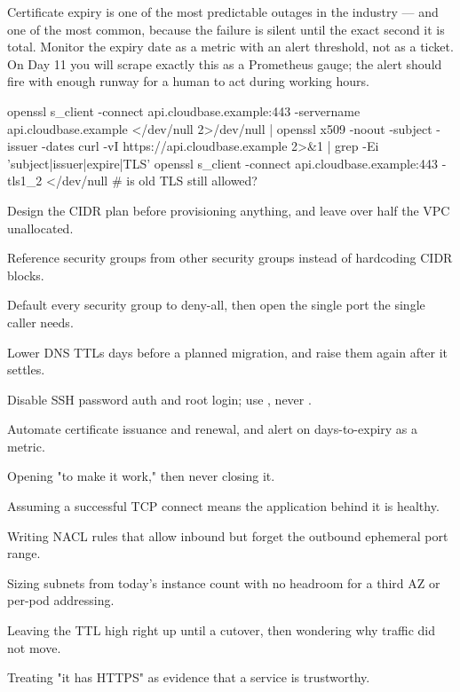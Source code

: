 \begin{reliability}
Certificate expiry is one of the most predictable outages in the industry --- and one of the most common, because the failure is silent until the exact second it is total. Monitor the expiry date as a metric with an alert threshold, not as a ticket. On Day 11 you will scrape exactly this as a Prometheus gauge; the alert should fire with enough runway for a human to act during working hours.
\end{reliability}

\begin{bashbox}
openssl s_client -connect api.cloudbase.example:443 -servername api.cloudbase.example </dev/null 2>/dev/null | openssl x509 -noout -subject -issuer -dates
curl -vI https://api.cloudbase.example 2>&1 | grep -Ei 'subject|issuer|expire|TLS'
openssl s_client -connect api.cloudbase.example:443 -tls1_2 </dev/null   # is old TLS still allowed?
\end{bashbox}

\begin{bestpractices}
\begin{wbitem}
  \item Design the CIDR plan before provisioning anything, and leave over half the VPC unallocated.
  \item Reference security groups from other security groups instead of hardcoding CIDR blocks.
  \item Default every security group to deny-all, then open the single port the single caller needs.
  \item Lower DNS TTLs days before a planned migration, and raise them again after it settles.
  \item Disable SSH password auth and root login; use , never .
  \item Automate certificate issuance and renewal, and alert on days-to-expiry as a metric.
\end{wbitem}
\end{bestpractices}
\begin{mistakes}
\begin{wbitem}
  \item Opening  "to make it work," then never closing it.
  \item Assuming a successful TCP connect means the application behind it is healthy.
  \item Writing NACL rules that allow inbound but forget the outbound ephemeral port range.
  \item Sizing subnets from today's instance count with no headroom for a third AZ or per-pod addressing.
  \item Leaving the TTL high right up until a cutover, then wondering why traffic did not move.
  \item Treating "it has HTTPS" as evidence that a service is trustworthy.
\end{wbitem}
\end{mistakes}


